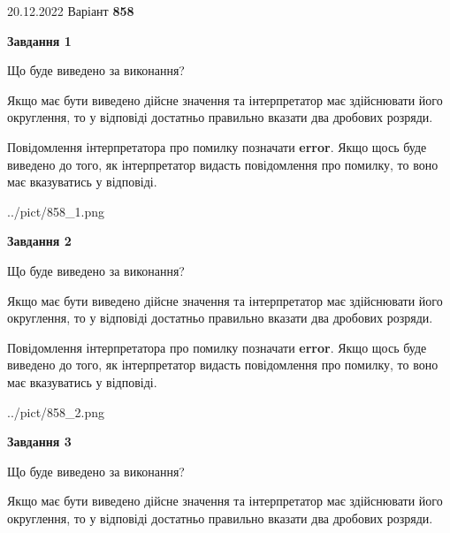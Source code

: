 \documentclass[12pt, ukrainian]{article}
\begin{document}
{20.12.2022 Варіант \No \textbf { 858 }\par}
{
\begin {Large}

{\begin {center}\textbf{Завдання 1}\end {center}}\par
Що буде виведено за виконання? \par

Якщо має бути виведено дійсне значення та інтерпретатор має здійснювати його округлення, 
то у відповіді достатньо правильно вказати два дробових розряди.

Повідомлення інтерпретатора про помилку позначати \textbf{error}.
Якщо щось буде виведено до того, як інтерпретатор видасть повідомлення про помилку, 
то воно має вказуватись у відповіді. \par

\begin{center}
	{../pict/858_1.png}
\end{center}
\newpage

{\begin {center}\textbf{Завдання 2}\end {center}}\par
Що буде виведено за виконання? \par

Якщо має бути виведено дійсне значення та інтерпретатор має здійснювати його округлення, 
то у відповіді достатньо правильно вказати два дробових розряди.

Повідомлення інтерпретатора про помилку позначати \textbf{error}.
Якщо щось буде виведено до того, як інтерпретатор видасть повідомлення про помилку, 
то воно має вказуватись у відповіді. \par

\begin{center}
	{../pict/858_2.png}
\end{center}
\newpage

{\begin {center}\textbf{Завдання 3}\end {center}}\par
Що буде виведено за виконання? \par

Якщо має бути виведено дійсне значення та інтерпретатор має здійснювати його округлення, 
то у відповіді достатньо правильно вказати два дробових розряди.


\end{Large}}
\end{document}
